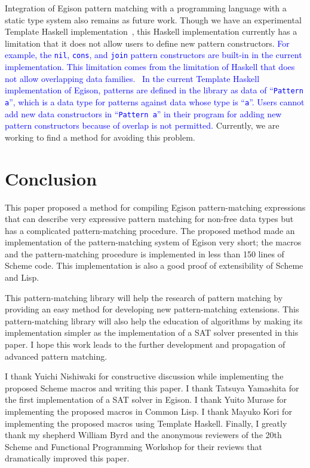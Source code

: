 \documentclass[acmlarge]{acmart}
\newcommand{\new}[1]{\textcolor{blue}{#1}}
\begin{document}
Integration of Egison pattern matching with a programming language with a static type system also remains as future work.
Though we have an experimental Template Haskell implementation~\cite{egisonHaskell}, this Haskell implementation currently has a limitation that it does not allow users to define new pattern constructors.
\new{
For example, the \lstinline{nil}, \lstinline{cons}, and \lstinline{join} pattern constructors are built-in in the current implementation.
This limitation comes from the limitation of Haskell that does not allow overlapping data families.~\cite{ghcMan}
In the current Template Haskell implementation of Egison, patterns are defined in the library as data of ``\lstinline{Pattern a}'', which is a data type for patterns against data whose type is ``\lstinline{a}''.
Users cannot add new data constructors in ``\lstinline{Pattern a}'' in their program for adding new pattern constructors because of overlap is not permitted.
}%
Currently, we are working to find a method for avoiding this problem.


\section{Conclusion}\label{conclusion}

This paper proposed a method for compiling Egison pattern-matching expressions that can describe very expressive pattern matching for non-free data types but has a complicated pattern-matching procedure.
The proposed method made an implementation of the pattern-matching system of Egison very short; the macros and the pattern-matching procedure is implemented in less than 150 lines of Scheme code.
This implementation is also a good proof of extensibility of Scheme and Lisp.

This pattern-matching library will help the research of pattern matching by providing an easy method for developing new pattern-matching extensions.
This pattern-matching library will also help the education of algorithms by making its implementation simpler as the implementation of a SAT solver presented in this paper.
I hope this work leads to the further development and propagation of advanced pattern matching.

\begin{acks}
  I thank Yuichi Nishiwaki for constructive discussion while implementing the proposed Scheme macros and writing this paper.
  I thank Tatsuya Yamashita for the first implementation of a SAT solver in Egison.
  I thank Yuito Murase for implementing the proposed macros in Common Lisp.
  I thank Mayuko Kori for implementing the proposed macros using Template Haskell.
  Finally, I greatly thank my shepherd William Byrd and the anonymous reviewers of the 20th Scheme and Functional Programming Workshop for their reviews that dramatically improved this paper.
\end{acks}
\end{document}
